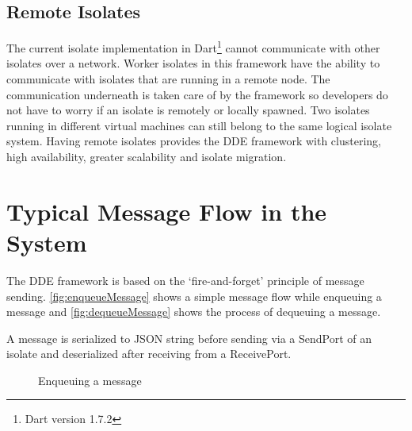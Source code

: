 \subsection{Remote Isolates}
\label{subsec:remoteIsolate}
  The current isolate implementation in Dart\footnote{Dart version 1.7.2} cannot communicate with other isolates over a network. Worker isolates in this framework have the ability to communicate with isolates that are running in a remote node. The communication underneath is taken care of by the framework so developers do not have to worry if an isolate is remotely or locally spawned. Two isolates running in different virtual machines can still belong to the same logical isolate system. Having remote isolates provides the \acrshort{DDE} framework with clustering, high availability, greater scalability and isolate migration.

\section{Typical Message Flow in the System}
The \acrshort{DDE} framework is based on the ‘fire-and-forget’ principle of message sending. \autoref{fig:enqueueMessage} shows a simple message flow while enqueuing a message and \autoref{fig:dequeueMessage} shows the process of dequeuing a message.

  A message is serialized to JSON string before sending via a SendPort of an isolate and deserialized after receiving from a ReceivePort.

\begin{figure}[H]
  \centering
  \tiny
\begin{sequencediagram}


\end{sequencediagram}
  \caption{Enqueuing a message}
  \label{fig:enqueueMessage}
\end{figure}
\normalsize

